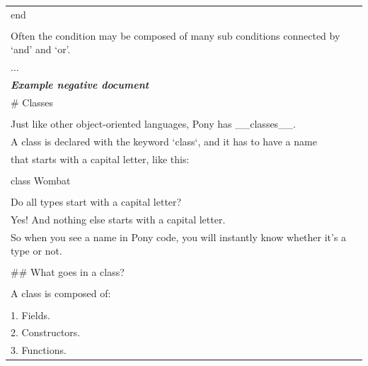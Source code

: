 \begin{table}[ht]
\begin{tabular}{p{13cm}}
end \\
\\
Often the condition may be composed of many sub conditions connected by `and' and `or'. \\
... \\
\midrule
\textit{\textbf{Example negative document}} \\
\midrule
\# Classes \\
\\
Just like other object-oriented languages, Pony has \_\_classes\_\_. \\
A class is declared with the keyword `class`, and it has to have a name \\
that starts with a capital letter, like this: \\
\\
class Wombat \\
\\
Do all types start with a capital letter?\\
Yes! And nothing else starts with a capital letter. \\
So when you see a name in Pony code, you will instantly know whether it's a type or not. \\
\\
\#\# What goes in a class? \\
\\
A class is composed of: \\
\\
1. Fields. \\
2. Constructors. \\
3. Functions. \\


\end{tabular}
\end{table}
